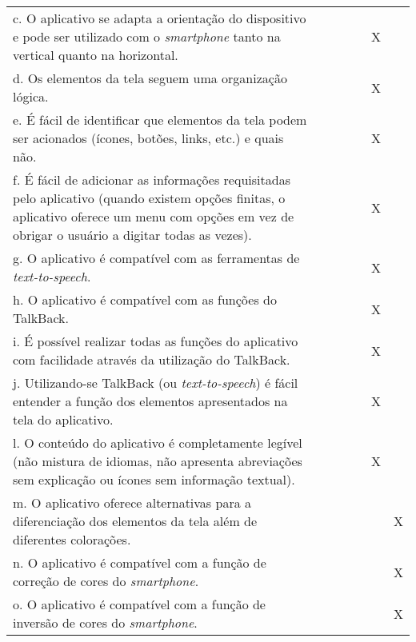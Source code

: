 \documentclass[portuguese,oneside]{tcc}
\begin{document}
\begin{center}
\begin{longtabu}{|L{25em}|c|c|c|c|c|c|}
							c. O aplicativo se adapta a orientação do dispositivo e pode ser utilizado com o \emph{smartphone} tanto na vertical quanto na horizontal. & & & & & X & \\ 
							d. Os elementos da tela seguem uma organização lógica. & & & & & X & \\ 
							e. É fácil de identificar que elementos da tela podem ser acionados (ícones, botões, links, etc.) e quais não. & & & & & X & \\ 
							f. É fácil de adicionar as informações requisitadas pelo aplicativo (quando existem opções finitas, o aplicativo oferece um menu com opções em vez de obrigar o usuário a digitar todas as vezes). & & & & & X & \\ 
							g. O aplicativo é compatível com as ferramentas de \emph{text-to-speech}. & & & & & X & \\ 
							h. O aplicativo é compatível com as funções do TalkBack. & & & & & X & \\ 
							i. É possível realizar todas as funções do aplicativo com facilidade através da utilização do TalkBack.	& & & & & X & \\ 
							j. Utilizando-se TalkBack (ou \emph{text-to-speech}) é fácil entender a função dos elementos apresentados na tela do aplicativo. & & & & & X & \\ 
							l. O conteúdo do aplicativo é completamente legível (não mistura de idiomas, não apresenta abreviações sem explicação ou ícones sem informação textual). & & & & & X & \\ 
							m. O aplicativo oferece alternativas para a diferenciação dos elementos da tela além de diferentes colorações. & & & & & & X \\ 
							n. O aplicativo é compatível com a função de correção de cores do \emph{smartphone}. & & & & & & X \\ 
							o. O aplicativo é compatível com a função de inversão de cores do \emph{smartphone}. & & & & & & X \\ 
						\end{longtabu}
					\end{center}
					
\end{document}
